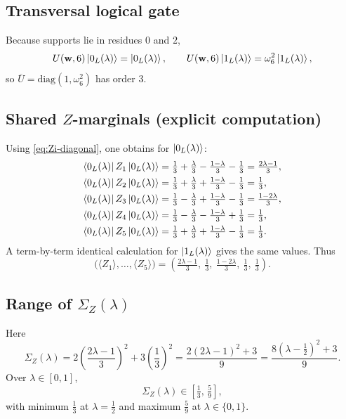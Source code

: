 \documentclass[11pt]{article}
\begin{document}
\subsection{Transversal logical gate}
Because supports lie in residues $0$ and $2$,
\[
U(\mathbf w,6)\ket{0_L(\lambda)}=\ket{0_L(\lambda)},\qquad
U(\mathbf w,6)\ket{1_L(\lambda)}=\omega_6^{2}\ket{1_L(\lambda)},
\]
so $\overline U=\mathrm{diag}(1,\omega_6^{2})$ has order $3$.

\subsection{Shared $Z$-marginals (explicit computation)}
Using \eqref{eq:Zi-diagonal}, one obtains for $\ket{0_L(\lambda)}$:
\[
\begin{aligned}
\bra{0_L(\lambda)}Z_1\ket{0_L(\lambda)}&=\tfrac13+\tfrac{\lambda}{3}-\tfrac{1-\lambda}{3}-\tfrac13=\tfrac{2\lambda-1}{3},\\
\bra{0_L(\lambda)}Z_2\ket{0_L(\lambda)}&=\tfrac13+\tfrac{\lambda}{3}+\tfrac{1-\lambda}{3}-\tfrac13=\tfrac{1}{3},\\
\bra{0_L(\lambda)}Z_3\ket{0_L(\lambda)}&=\tfrac13-\tfrac{\lambda}{3}+\tfrac{1-\lambda}{3}-\tfrac13=\tfrac{1-2\lambda}{3},\\
\bra{0_L(\lambda)}Z_4\ket{0_L(\lambda)}&=\tfrac13-\tfrac{\lambda}{3}-\tfrac{1-\lambda}{3}+\tfrac13=\tfrac{1}{3},\\
\bra{0_L(\lambda)}Z_5\ket{0_L(\lambda)}&=\tfrac13+\tfrac{\lambda}{3}+\tfrac{1-\lambda}{3}-\tfrac13=\tfrac{1}{3}.
\end{aligned}
\]
A term-by-term identical calculation for $\ket{1_L(\lambda)}$ gives the same values.
Thus
\[
\boxed{
\bigl(\langle Z_1\rangle,\dots,\langle Z_5\rangle\bigr)
=
\left(\tfrac{2\lambda-1}{3},\ \tfrac13,\ \tfrac{1-2\lambda}{3},\ \tfrac13,\ \tfrac13\right).
}
\]

\subsection{Range of $\Sigma_Z(\lambda)$}
Here
\[
\Sigma_Z(\lambda)=2\left(\frac{2\lambda-1}{3}\right)^2+3\left(\frac13\right)^2
=\frac{2(2\lambda-1)^2+3}{9}
=\frac{8\left(\lambda-\tfrac12\right)^2+3}{9}.
\]
Over $\lambda\in[0,1]$,
\[
\boxed{\Sigma_Z(\lambda)\in\left[\tfrac13,\,\tfrac59\right],}
\]
with minimum $\tfrac13$ at $\lambda=\tfrac12$ and maximum $\tfrac59$ at $\lambda\in\{0,1\}$.

\bigskip

\end{document}
